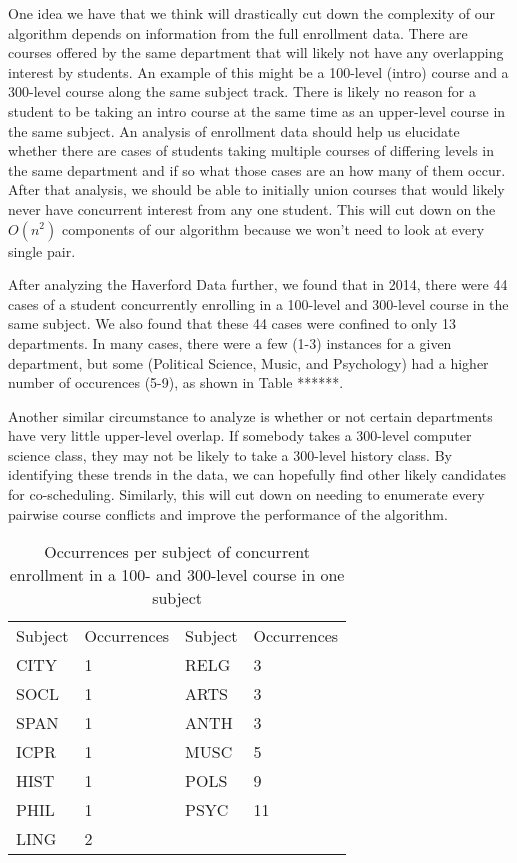 \documentclass[11pt, oneside]{article}   	%
\begin{document}
One idea we have that we think will drastically cut down the complexity of our algorithm depends on information from the full enrollment data. There are courses offered by the same department that will likely not have any overlapping interest by students. An example of this might be a 100-level (intro) course and a 300-level course along the same subject track. There is likely no reason for a student to be taking an intro course at the same time as an upper-level course in the same subject. An analysis of enrollment data should help us elucidate whether there are cases of students taking multiple courses of differing levels in the same department and if so what those cases are an how many of them occur. After that analysis, we should be able to initially union courses that would likely never have concurrent interest from any one student. This will cut down on the $O(n^2)$ components of our algorithm because we won't need to look at every single pair.

After analyzing the Haverford Data further, we found that in 2014, there were 44 cases of a student concurrently enrolling in a 100-level and 300-level course in the same subject. We also found that these 44 cases were confined to only 13 departments. In many cases, there were a few (1-3) instances for a given department, but some (Political Science, Music, and Psychology) had a higher number of occurences (5-9), as shown in Table ******.

Another similar circumstance to analyze is whether or not certain departments have very little upper-level overlap. If somebody takes a 300-level computer science class, they may not be likely to take a 300-level history class. By identifying these trends in the data, we can hopefully find other likely candidates for co-scheduling. Similarly, this will cut down on needing to enumerate every pairwise course conflicts and improve the performance of the algorithm.



\begin{table}[]
\centering
\begin{tabular}{llll}
Subject & Occurrences & Subject & Occurrences \\
CITY    & 1           & RELG    & 3           \\
SOCL    & 1           & ARTS    & 3           \\
SPAN    & 1           & ANTH    & 3           \\
ICPR    & 1           & MUSC    & 5           \\
HIST    & 1           & POLS    & 9           \\
PHIL    & 1           & PSYC    & 11          \\
LING    & 2           &         &             \\        
\end{tabular}
\caption{Occurrences per subject of concurrent enrollment in a 100- and 300-level course in one subject}
\label{my-label}
\end{table}
\end{document}

